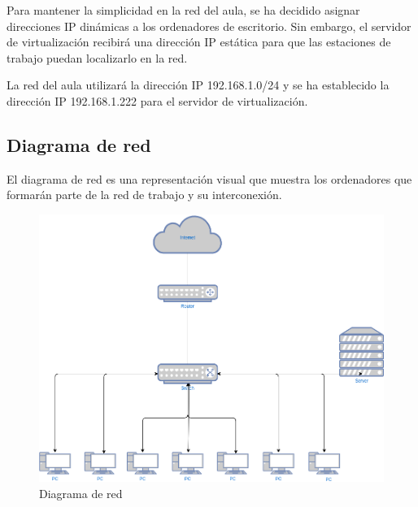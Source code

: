 		Para mantener la simplicidad en la red del aula, se ha decidido asignar direcciones IP dinámicas a los ordenadores de escritorio. Sin embargo, el servidor de virtualización recibirá una dirección IP estática para que las estaciones de trabajo puedan localizarlo en la red.
		
		La red del aula utilizará la dirección IP 192.168.1.0/24 y se ha establecido la dirección IP 192.168.1.222 para el servidor de virtualización.
				
		\subsection{Diagrama de red}
				
			El diagrama de red es una representación visual que muestra los ordenadores que formarán parte de la red de trabajo y su interconexión.\par
			
			\begin{figure}[h]
				\centering
				\includegraphics[height=0.6\textwidth]{imagenes/red/diagrama.png}
				\caption{Diagrama de red}
				\label{fig:red local lan}
			\end{figure}
			
				
